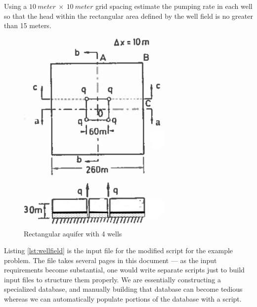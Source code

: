 Using a $10~meter~\times~10~meter$ grid spacing estimate the pumping rate in each well so that the head within the rectangular area defined by the well field is no greater than 15 meters.
\begin{figure}[h!] %
   \centering
   \includegraphics[height=4in]{./17-SteadyGroundwaterFlow/4WellsSteady.jpg} 
   \caption{Rectangular aquifer with 4 wells}
   \label{fig:4WellsSteady}
\end{figure}
\clearpage

Listing \ref{lst:wellfield} is the input file for the modified script for the example problem.  
The file takes several pages in this document --- as the input requirements become substantial, one would write separate scripts just to build input files to structure them properly.  
We are essentially constructing a specialized database, and manually building that database can become tedious whereas we can automatically populate portions of the database with a script. 

